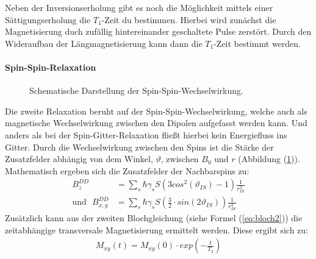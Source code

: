 Neben der Inversionserholung gibt es noch die M\"{o}glichkeit mittels einer S\"{a}ttigungs{\-}erhol{\-}ung die $T_1$-Zeit du bestimmen.
Hierbei wird zun\"{a}chst die Magnetisierung duch zuf\"{a}llig hintereinander geschaltete Pulse zerst\"{o}rt.
Durch den Wideraufbau der L\"{a}ngmagnetisierung kann dann die $T_1$-Zeit bestimmt werden.

\paragraph{Spin-Spin-Relaxation}
\begin{figure}
	\centering
	\vspace{-10pt}
	\caption{Schematische Darstellung der Spin-Spin-Wechselwirkung.}
	\label{SpinSpin}
\end{figure}
Die zweite Relaxation be{\-}ruht auf der Spin-Spin-Wechselwirkung, welche auch als magnetische Wechselwirkung zwischen den Dipolen aufgefasst werden kann.
Und anders als bei der Spin-Gitter-Relaxation flie{\ss}t hierbei kein Energiefluss ins Gitter.
Durch die Wechselwirkung zwischen den Spins ist die St\"{a}rke der Zusatzfelder abh\"{a}ngig von dem Winkel, $\vartheta$, zwischen $B_0$ und $r$ (Abbildung (\ref{SpinSpin})).
Mathematisch ergeben sich die Zusatzfelder der Nachbarspins zu:
\begin{align*}
	B_z^{DD} &= \sum_s \hbar \gamma_s S \left( 3 cos^2 \left(\vartheta_{IS}\right) - 1 \right) \frac{1}{r_{IS}^3} \\
	\text{und} \, \, \, \, B_{x,y}^{DD} &= \sum_s \hbar \gamma_s S \left( \frac{3}{2} \cdot sin\left(2 \vartheta_{IS}\right) \right) \frac{1}{r_{IS}^3}
\end{align*}
Zus\"{a}tzlich kann aus der zweiten Blochgleichung (siehe Formel (\ref{eq:bloch2})) die zeitabh\"{a}ngige transversale Magnetisierung ermittelt werden.
Diese ergibt sich zu:
\begin{align*}
	M_{xy} (t) = M_{xy} (0) \cdot exp \left( - \frac{t}{T_2} \right)
	\label{eq:Mxy}
\end{align*}

